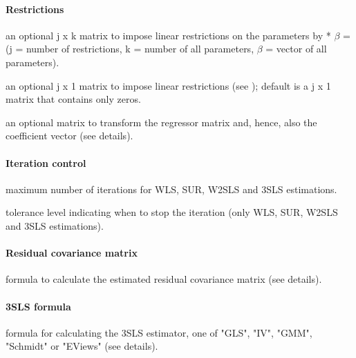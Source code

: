 \documentclass[article]{jss}
\begin{document}
\paragraph{Restrictions}   
 an optional j x k matrix to impose linear
   restrictions on the parameters by  * $\beta$ = 
   (j = number of restrictions, k = number of all parameters,
   $\beta$ = vector of all parameters).

 an optional j x 1 matrix to impose linear
   restrictions (see ); default is a j x 1 matrix
   that contains only zeros.

 an optional matrix to transform the regressor matrix and,
   hence, also the coefficient vector (see details).

\paragraph{Iteration control}
 maximum number of iterations for WLS, SUR, W2SLS and
   3SLS estimations.

 tolerance level indicating when to stop the iteration (only
   WLS, SUR, W2SLS and 3SLS estimations).

\paragraph{Residual covariance matrix}   
 formula to calculate the estimated residual covariance
   matrix (see details).

\paragraph{3SLS formula}   
 formula for calculating the 3SLS estimator,
   one of "GLS", "IV", "GMM", "Schmidt" or "EViews" (see details).
\end{document}
